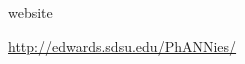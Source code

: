 \documentclass{beamer}
\begin{document}
\begin{frame}{website}
\begin{center}
\url{http://edwards.sdsu.edu/PhANNies/}
\end{center}
\end{frame}

\end{document}
